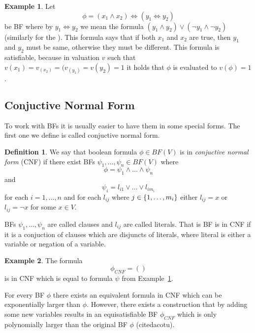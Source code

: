 \documentclass[
  digital, %
  twoside, %
  table,   %
  nolof,     %
  nolot,     %
]{fithesis3}
\let\setbuilder\set
\newcommand{\simpleset}[1]{\{{#1}\}}
\renewcommand{\set}[1]{\normalexpandarg\IfSubStr{#1}{|}{\setbuilder{#1}}{\simpleset{#1}}}
\theoremstyle{definition}
\newtheorem{definition}{Definition}
\newtheorem{example}{Example}
\theoremstyle{remark}
\newcommand{\BF}[1]{BF(#1)}
\newcommand{\lequal}{\Leftrightarrow}
\begin{document}
\begin{example}
\label{ex:BF:prenex}
Let
\[\phi = (x_1 \land x_2) \lequal (y_1 \lequal y_2)\]
be BF where by $y_1 \lequal y_2$ we mean the formula $(y_1 \land y_2) \lor (\neg y_1 \land \neg y_2)$ (similarly for the ). This formula says that if both $x_1$ and $x_2$ are true, then $y_1$ and $y_2$ must be same, otherwise they must be different. This formula is satisfiable, because in valuation $v$ such that $v(x_1) = v_(x_2) = (v_(y_1) = v(y_2) = 1$ it holds that $\phi$ is evaluated to $v(\phi)=1$.
\end{example}

\subsection{Conjuctive Normal Form}
\label{sec:BF:CNF}
To work with BFs it is usually easier to have them in some special forms. The first one we define is called conjuctive normal form.

\begin{definition}
We say that boolean formula $\phi \in \BF{V}$ is in \emph{conjuctive normal form} (CNF) if there exist BFs $\psi_1,\dots,\psi_n \in \BF{V}$ where
\[\phi = \psi_1 \land \dots \land \psi_n\]
and
\[\psi_i = l_{i1} \lor \dots \lor l_{i{m_i}}\]
for each $i = 1, \dots, n$ and for each $l_{ij}$ where $j \in \set{1,\dots,m_i}$ either $l_{ij} = x$ or $l_{ij} = \neg x$ for some $x \in V$.
\end{definition}
BFs $\psi_1,\dots,\psi_n$ are called clauses and $l_{ij}$ are called literals. That is BF is in CNF if it is a conjuction of clauses which are disjuncts of literals, where literal is either a variable or negation of a variable.

\begin{example}
The formula
\[\phi_{CNF} = ()\]
is in CNF which is equal to formula $\psi$ from Example~\ref{ex:BF:prenex}.
\end{example}

For every BF $\phi$ there exists an equivalent formula in CNF which can be exponentially larger than $\phi$. However, there exists a construction that by adding some new variables results in an equisatisfiable BF $\phi_{CNF}$ which is only polynomially larger than the original BF $\phi$ (citedacotu).
\end{document}
